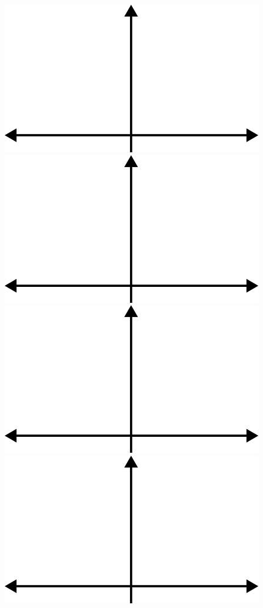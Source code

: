 \documentclass[fleqn]{beamer} %
\begin{document}
\begin{frame}[label=sectionIIsubsectionI]
\vspace{3mm} 
\begin{multicols}{4}      
  \includegraphics[scale=.225]{images/distribution_axes.png}     
  \includegraphics[scale=.225]{images/distribution_axes.png}     
  \includegraphics[scale=.225]{images/distribution_axes.png}     
  \includegraphics[scale=.225]{images/distribution_axes.png}     
\end{multicols}

      \end{frame}
      
\end{document}
